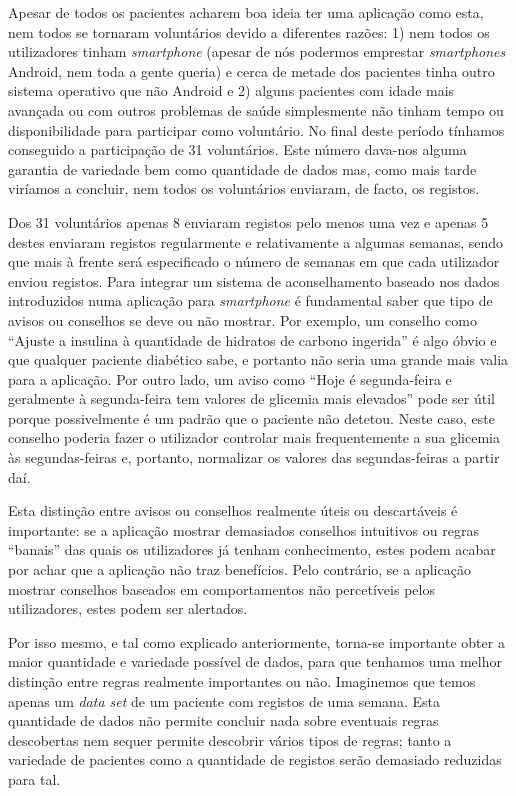 Apesar de todos os pacientes acharem boa ideia ter uma aplicação como esta, nem todos se tornaram voluntários devido a diferentes razões: 1) nem todos os utilizadores tinham \textit{smartphone} (apesar de nós podermos emprestar \textit{smartphones} Android, nem toda a gente queria) e cerca de metade dos pacientes tinha outro sistema operativo que não Android e 2) alguns pacientes com idade mais avançada ou com outros problemas de saúde simplesmente não tinham tempo ou disponibilidade para participar como voluntário. 
No final deste período tínhamos conseguido a participação de 31 voluntários. Este número dava-nos alguma garantia de variedade bem como quantidade de dados mas, como mais tarde viríamos a concluir, nem todos os voluntários enviaram, de facto, os registos.

Dos 31 voluntários apenas 8 enviaram registos pelo menos uma vez e apenas 5 destes enviaram registos regularmente e relativamente a algumas semanas, sendo que mais à frente será especificado o número de semanas em que cada utilizador enviou registos. Para integrar um sistema de aconselhamento baseado nos dados introduzidos numa aplicação para \textit{smartphone} é fundamental saber que tipo de avisos ou conselhos se deve ou não mostrar. Por exemplo, um conselho como ``Ajuste a insulina à quantidade de hidratos de carbono ingerida'' é algo óbvio e que qualquer paciente diabético sabe, e portanto não seria uma grande mais valia para a aplicação. Por outro lado, um aviso como ``Hoje é segunda-feira e geralmente à segunda-feira tem valores de glicemia mais elevados'' pode ser útil porque possivelmente é um padrão que o paciente não detetou. Neste caso, este conselho poderia fazer o utilizador controlar mais frequentemente a sua glicemia às segundas-feiras e, portanto, normalizar os valores das segundas-feiras a partir daí. 

Esta distinção entre avisos ou conselhos realmente úteis ou descartáveis é importante: se a aplicação mostrar demasiados conselhos intuitivos ou regras ``banais'' das quais os utilizadores já tenham conhecimento, estes podem acabar por achar que a aplicação não traz benefícios. Pelo contrário, se a aplicação mostrar conselhos baseados em comportamentos não percetíveis pelos utilizadores, estes podem ser alertados. 

Por isso mesmo, e tal como explicado anteriormente, torna-se importante obter a maior quantidade e variedade possível de dados, para que tenhamos uma melhor distinção entre regras realmente importantes ou não. Imaginemos que temos apenas um \textit{data set} de um paciente com registos de uma semana. Esta quantidade de dados não permite concluir nada sobre eventuais regras descobertas nem sequer permite descobrir vários tipos de regras; tanto a variedade de pacientes como a quantidade de registos serão demasiado reduzidas para tal. 

